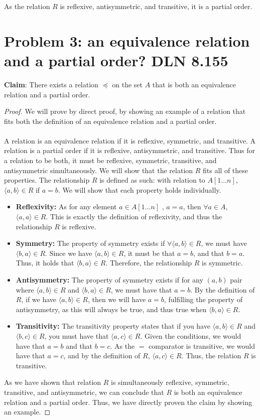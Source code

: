 \documentclass[titlepage]{article}
\begin{document}
As the relation $R$ is reflexive, antisymmetric, and transitive, it is a partial order.

\section{Problem 3: an equivalence relation and a partial order? DLN 8.155}

\textbf{Claim}: There exists a relation $\preceq$ on the set $A$ that is both an equivalence relation and a partial order.

\begin{proof}
We will prove by direct proof, by showing an example of a relation that fits both the definition of an equivalence relation and a partial order.
\\
\\
A relation is an equivalence relation if it is reflexive, symmetric, and transitive. A relation is a partial order if it is reflexive, antisymmetric, and transitive. Thus for a relation to be both, it must be reflexive, symmetric, transitive, and antisymmetric simultaneously. We will show that the relation $R$ fits all of these properties. The relationship $R$ is defined as such: with relation to $A[1...n]$, $\langle a,b \rangle \in R$ if $a=b$. We will show that each property holds individually.
\begin{itemize}
\item \textbf{Reflexivity:} As for any element $a \in A[1...n]$ , $a=a$, then $\forall a \in A$, $\langle a,a \rangle \in R$. This is exactly the definition of reflexivity, and thus the relationship $R$ is reflexive.
\item \textbf{Symmetry:} The property of symmetry exists if $\forall \langle a,b \rangle \in R$, we must have $\langle b,a \rangle \in R$. Since we have $\langle a,b \rangle \in R$, it must be that $a=b$, and that $b=a$. Thus, it holds that $\langle b,a \rangle \in R$. Therefore, the relationship $R$ is symmetric.
\item \textbf{Antisymmetry: }The property of symmetry exists if for any $(a,b)$ pair where $\langle a,b \rangle \in R$ and $\langle b,a \rangle \in R$, we must have that $a=b$. By the definition of $R$, if we have $\langle a,b \rangle \in R$, then we will have $a=b$, fulfilling the property of antisymmetry, as this will always be true, and thus true when $\langle b,a \rangle \in R$.
\item \textbf{Transitivity:} The transitivity property states that if you have $\langle a,b \rangle \in R$ and $\langle b,c \rangle \in R$, you must have that $\langle a,c \rangle \in R$. Given the conditions, we would have that $a=b$ and that $b=c$. As the $=$ comparator is transitive, we would have that $a=c$, and by the definition of $R$, $\langle a,c \rangle \in R$. Thus, the relation $R$ is transitive.
\end{itemize}
As we have shown that relation $R$ is simultaneously reflexive, symmetric, transitive, and antisymmetric, we can conclude that $R$ is both an equivalence relation and a partial order. Thus, we have directly proven the claim by showing an example.
\end{proof}
\end{document}

